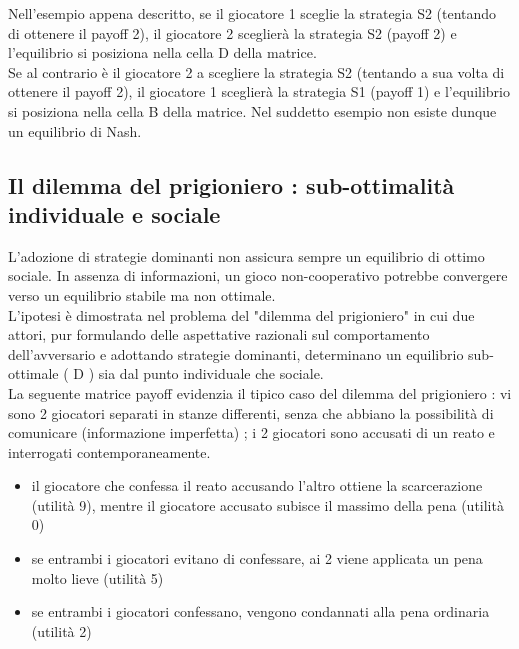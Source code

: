 Nell'esempio appena descritto, se il giocatore 1 sceglie la strategia S2 (tentando di ottenere il payoff 2), il giocatore 2 sceglierà la strategia S2 (payoff 2) e l'equilibrio si posiziona nella cella D della matrice.\\
Se al contrario è il giocatore 2 a scegliere la strategia S2 (tentando a sua volta di ottenere il payoff 2), il giocatore 1 sceglierà la strategia S1 (payoff 1) e l'equilibrio si posiziona nella cella B della matrice. Nel suddetto esempio non esiste dunque un equilibrio di Nash.\newline

\subsection{Il dilemma del prigioniero : sub-ottimalità individuale e sociale}
\justify
L'adozione di strategie dominanti non assicura sempre un equilibrio di ottimo sociale. In assenza di informazioni, un gioco non-cooperativo potrebbe convergere verso un equilibrio stabile ma non ottimale.\\
L'ipotesi è dimostrata nel problema del "dilemma del prigioniero" in cui due attori, pur formulando delle aspettative razionali sul comportamento dell'avversario e adottando strategie dominanti, determinano un equilibrio sub-ottimale ( D ) sia dal punto individuale che sociale.\\
La seguente matrice payoff evidenzia il tipico caso del dilemma del prigioniero : vi sono 2 giocatori separati in stanze differenti, senza che abbiano la possibilità di comunicare (informazione imperfetta) ; i 2 giocatori sono accusati di un reato e interrogati contemporaneamente.

\begin{itemize}
	\item il giocatore che confessa il reato accusando l'altro ottiene la scarcerazione (utilità 9), mentre il giocatore accusato subisce il massimo della pena (utilità 0)
	\item se entrambi i giocatori evitano di confessare, ai 2 viene applicata un pena molto lieve (utilità 5)
	\item se entrambi i giocatori confessano, vengono condannati alla pena ordinaria (utilità 2)
\end{itemize}

